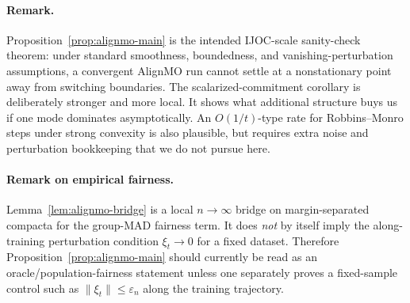 \paragraph{Remark.}
Proposition~\ref{prop:alignmo-main} is the intended IJOC-scale sanity-check theorem:
under standard smoothness, boundedness, and vanishing-perturbation assumptions, a convergent AlignMO run cannot settle at a nonstationary point away from switching boundaries.
The scalarized-commitment corollary is deliberately stronger and more local.
It shows what additional structure buys us if one mode dominates asymptotically.
An $O(1/t)$-type rate for Robbins--Monro steps under strong convexity is also plausible,
but requires extra noise and perturbation bookkeeping that we do not pursue here.

\paragraph{Remark on empirical fairness.}
Lemma~\ref{lem:alignmo-bridge} is a local $n\to\infty$ bridge on margin-separated compacta for the
group-MAD fairness term. It does \emph{not} by itself imply the along-training perturbation condition
$\xi_t\to 0$ for a fixed dataset. Therefore Proposition~\ref{prop:alignmo-main} should currently be read as an
oracle/population-fairness statement unless one separately proves a fixed-sample control such as
$\|\xi_t\|\le \varepsilon_n$ along the training trajectory.
